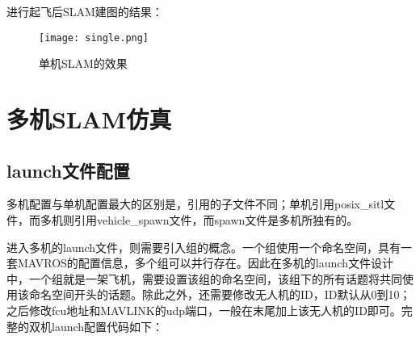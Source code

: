 
进行起飞后SLAM建图的结果：

\begin{figure}[!ht]
	\centering
	\texttt{[image: single.png]}
	\caption{单机SLAM的效果}
	\label{fig4-6}
\end{figure}




\section{多机SLAM仿真}


\subsection{launch文件配置} \label{4.3.1}

多机配置与单机配置最大的区别是，引用的子文件不同；单机引用posix\_sitl文件，而多机则引用vehicle\_spawn文件，而spawn文件是多机所独有的。

进入多机的launch文件，则需要引入组的概念。一个组使用一个命名空间，具有一套MAVROS的配置信息，多个组可以并行存在。因此在多机的launch文件设计中，一个组就是一架飞机，需要设置该组的命名空间，该组下的所有话题将共同使用该命名空间开头的话题。除此之外，还需要修改无人机的ID，ID默认从0到10；之后修改fcu地址和MAVLINK的udp端口，一般在末尾加上该无人机的ID即可。完整的双机launch配置代码如下：

